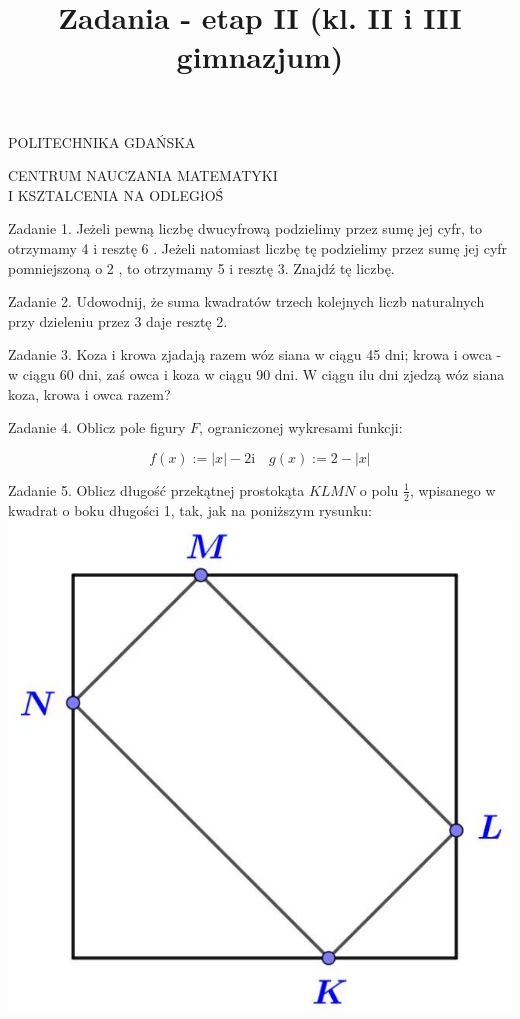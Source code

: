 \documentclass[10pt]{article}
\title{Zadania - etap II (kl. II i III gimnazjum) }
\author{}
\date{}
\begin{document}
\maketitle
POLITECHNIKA GDAŃSKA

CENTRUM NAUCZANIA MATEMATYKI\\
I KSZTALCENIA NA ODLEGłOŚ̉

Zadanie 1. Jeżeli pewną liczbę dwucyfrową podzielimy przez sumę jej cyfr, to otrzymamy 4 i resztę 6 . Jeżeli natomiast liczbę tę podzielimy przez sumę jej cyfr pomniejszoną o 2 , to otrzymamy 5 i resztę 3. Znajdź tę liczbę.

Zadanie 2. Udowodnij, że suma kwadratów trzech kolejnych liczb naturalnych przy dzieleniu przez 3 daje resztę 2.

Zadanie 3. Koza i krowa zjadają razem wóz siana w ciągu 45 dni; krowa i owca - w ciągu 60 dni, zaś owca i koza w ciągu 90 dni. W ciągu ilu dni zjedzą wóz siana koza, krowa i owca razem?

Zadanie 4. Oblicz pole figury \(F\), ograniczonej wykresami funkcji:

\[
f(x):=|x|-2 \mathrm{i} \quad g(x):=2-|x|
\]

Zadanie 5. Oblicz długość przekątnej prostokąta \(K L M N\) o polu \(\frac{1}{2}\), wpisanego w kwadrat o boku długości 1, tak, jak na poniższym rysunku:\\
\includegraphics[max width=\textwidth, center]{2024_11_21_559aeed01947f67dd506g-1}
\end{document}
